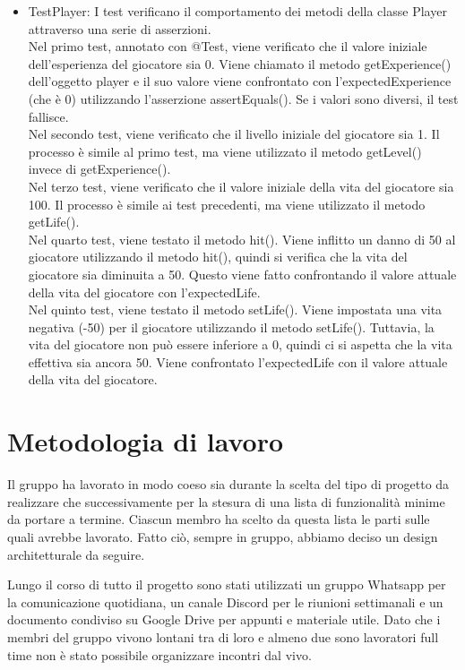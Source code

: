 \documentclass[a4paper,12pt]{report}
\begin{document}
\begin{itemize}
	\item TestPlayer: I test verificano il comportamento dei metodi della classe Player attraverso una serie di asserzioni.
	\\Nel primo test, annotato con @Test, viene verificato che il valore iniziale dell'esperienza del giocatore sia 0. Viene chiamato il metodo getExperience() dell'oggetto player e il suo valore viene confrontato con l'expectedExperience (che è 0) utilizzando l'asserzione assertEquals(). Se i valori sono diversi, il test fallisce.
    \\Nel secondo test, viene verificato che il livello iniziale del giocatore sia 1. Il processo è simile al primo test, ma viene utilizzato il metodo getLevel() invece di getExperience().
    \\Nel terzo test, viene verificato che il valore iniziale della vita del giocatore sia 100. Il processo è simile ai test precedenti, ma viene utilizzato il metodo getLife().
    \\Nel quarto test, viene testato il metodo hit(). Viene inflitto un danno di 50 al giocatore utilizzando il metodo hit(), quindi si verifica che la vita del giocatore sia diminuita a 50. Questo viene fatto confrontando il valore attuale della vita del giocatore con l'expectedLife.
    \\Nel quinto test, viene testato il metodo setLife(). Viene impostata una vita negativa (-50) per il giocatore utilizzando il metodo setLife(). Tuttavia, la vita del giocatore non può essere inferiore a 0, quindi ci si aspetta che la vita effettiva sia ancora 50. Viene confrontato l'expectedLife con il valore attuale della vita del giocatore.
\end{itemize}

\section{Metodologia di lavoro}
Il gruppo ha lavorato in modo coeso sia durante la scelta del tipo di progetto da realizzare che successivamente per la stesura di una lista di funzionalità minime da portare a termine. Ciascun membro ha scelto da questa lista le parti sulle quali avrebbe lavorato. Fatto ciò, sempre in gruppo, abbiamo deciso un design architetturale da seguire. 

Lungo il corso di tutto il progetto sono stati utilizzati un gruppo Whatsapp per la comunicazione quotidiana, un canale Discord per le riunioni settimanali e un documento condiviso su Google Drive per appunti e materiale utile. Dato che i membri del gruppo vivono lontani tra di loro e almeno due sono lavoratori full time non è stato possibile organizzare incontri dal vivo. 
\end{document}
